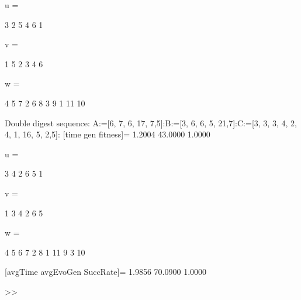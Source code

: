 u =

     3     2     5     4     6     1


v =

     1     5     2     3     4     6


w =

     4     5     7     2     6     8     3     9     1    11    10

Double digest sequence:
A:=[6, 7, 6, 17, 7,5]:B:=[3, 6, 6, 5, 21,7]:C:=[3, 3, 3, 4, 2, 4, 1, 16, 5, 2,5]:
[time gen fitness]=
    1.2004   43.0000    1.0000


u =

     3     4     2     6     5     1


v =

     1     3     4     2     6     5


w =

     4     5     6     7     2     8     1    11     9     3    10

[avgTime  avgEvoGen  SuccRate]=
    1.9856   70.0900    1.0000

>> 